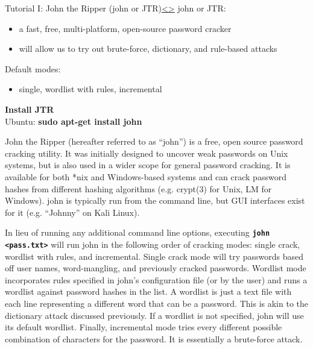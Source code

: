 \documentclass[12pt]{extarticle}
\newcommand{\code}[1]{\texttt{\bfseries#1}}
\newenvironment{instructionblock}{\Large\bgroup}{\egroup}
\newcommand{\bi}{\begin{itemize}}
\newcommand{\ei}{\end{itemize}}
\begin{document}
	\pagebreak
	\begin{slide}{Tutorial I: John the Ripper (john or JTR)}{\hyperref[slide 5]{\textless}\hyperref[slide 7]{\textgreater}}
		\begin{instructionblock}
			john or JTR:
			\bi 
			\item a fast, free, multi-platform, open-source password cracker
			\item will allow us to try out brute-force, dictionary, and rule-based attacks
			\ei 
			Default modes:
			\bi
			\item single, wordlist with rules, incremental
			\ei
			\textbf{Install JTR}\\
			Ubuntu: \textbf{sudo apt-get install john}
		\end{instructionblock}
	\end{slide}
	\vfill
	
	John the Ripper (hereafter referred to as ``john'') is a free, open source password cracking utility. It was initially designed to uncover weak passwords on Unix systems, but is also used in a wider scope for general password cracking. It is available for both *nix and Windows-based systems and can crack password hashes from different hashing algorithms (e.g. crypt(3) for Unix, LM for Windows). \cite{john} john is typically run from the command line, but GUI interfaces exist for it (e.g. ``Johnny'' on Kali Linux).
	
	In lieu of running any additional command line options, executing \code{john \textless pass.txt\textgreater} will run john in the following order of cracking modes: single crack, wordlist with rules, and incremental. Single crack mode will try passwords based off user names, word-mangling, and previously cracked passwords. Wordlist mode incorporates rules specified in john's configuration file (or by the user) and runs a wordlist against password hashes in the list. A wordlist is just a text file with each line representing a different word that can be a password. This is akin to the dictionary attack discussed previously. If a wordlist is not specified, john will use its default wordlist. Finally, incremental mode tries every different possible combination of characters for the password. It is essentially a brute-force attack. \cite{john}
	
\end{document}
